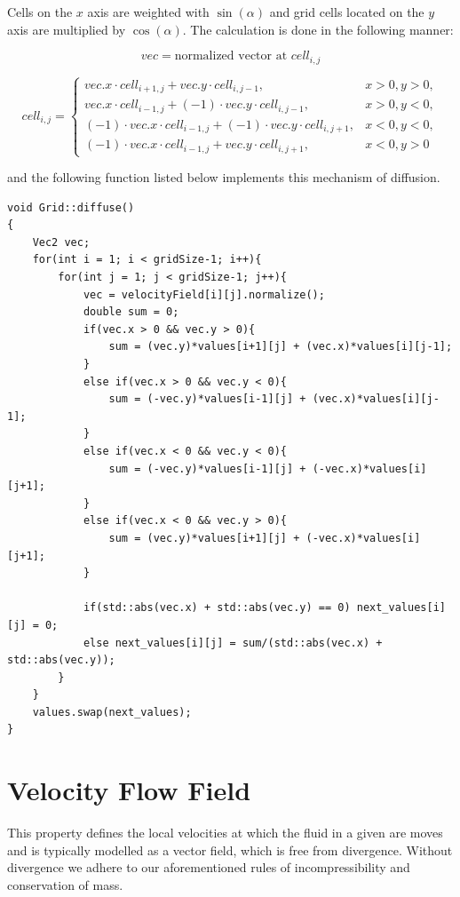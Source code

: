 \documentclass[12pt, titlepage]{article}
\begin{document}
\bigskip

Cells on the $x$ axis are weighted with $\sin(\alpha)$ and grid cells located on the $y$ axis are multiplied by $\cos(\alpha)$. The calculation is done in the following manner:

\[
	vec = \text{normalized vector at }cell_{i, j}
\]

\[
	cell_{i, j} = \begin{cases}
	vec.x \cdot cell_{i+1, j} + vec.y \cdot cell_{i, j-1}, & x > 0, y > 0, \\
	vec.x \cdot cell_{i-1, j} + (-1)\cdot vec.y \cdot cell_{i, j-1}, & x > 0, y < 0, \\
	(-1) \cdot vec.x \cdot cell_{i-1, j} + (-1) \cdot vec.y \cdot cell_{i, j+1}, & x < 0, y < 0, \\
	(-1) \cdot vec.x \cdot cell_{i-1, j} + vec.y \cdot cell_{i, j+1}, & x < 0, y > 0
	\end{cases}
\]

\noindent and the following function listed below implements this mechanism of diffusion.

\pagebreak

\begin{lstlisting}
void Grid::diffuse()
{
    Vec2 vec;
    for(int i = 1; i < gridSize-1; i++){
        for(int j = 1; j < gridSize-1; j++){
            vec = velocityField[i][j].normalize();
            double sum = 0;
            if(vec.x > 0 && vec.y > 0){
                sum = (vec.y)*values[i+1][j] + (vec.x)*values[i][j-1];
            }
            else if(vec.x > 0 && vec.y < 0){
                sum = (-vec.y)*values[i-1][j] + (vec.x)*values[i][j-1];
            }
            else if(vec.x < 0 && vec.y < 0){
                sum = (-vec.y)*values[i-1][j] + (-vec.x)*values[i][j+1];
            }
            else if(vec.x < 0 && vec.y > 0){
                sum = (vec.y)*values[i+1][j] + (-vec.x)*values[i][j+1];
            }

            if(std::abs(vec.x) + std::abs(vec.y) == 0) next_values[i][j] = 0;
            else next_values[i][j] = sum/(std::abs(vec.x) + std::abs(vec.y));
        }
    }
    values.swap(next_values);
}
\end{lstlisting}

\section{Velocity Flow Field}

This property defines the local velocities at which the fluid in a given are moves and is typically modelled as a vector field, which is free from divergence. Without divergence we adhere to our aforementioned rules of incompressibility and conservation of mass.
\end{document}

